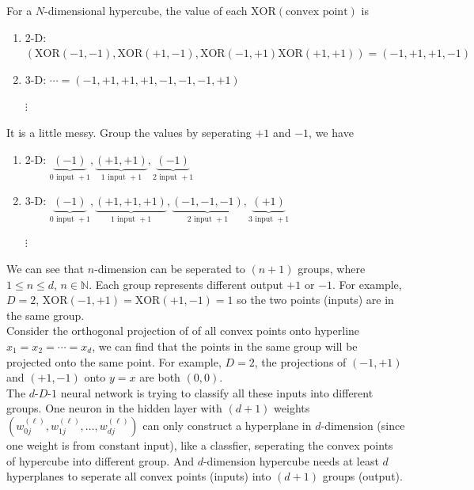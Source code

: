 \documentclass[12pt]{article}
\newcommand{\ParTh}[1]{\left(#1\right)}
\begin{document}
For a $N$-dimensional hypercube, the value of each $\text{XOR}\ParTh{\text{convex point}}$ is
\begin{enumerate}
	\item 2-D: $\ParTh{\text{XOR}\ParTh{-1,-1},\text{XOR}\ParTh{+1,-1},\text{XOR}\ParTh{-1,+1}\text{XOR}\ParTh{+1,+1}}=\ParTh{-1,+1,+1,-1}$
	\item 3-D: $\cdots=\ParTh{-1,+1,+1,+1,-1,-1,-1,+1}$
	\item[$\vdots$]
\end{enumerate}
It is a little messy. Group the values by seperating $+1$ and $-1$, we have
\begin{enumerate}
	\item 2-D: $\underbrace{\ParTh{-1}}_{0\text{ input } +1},\underbrace{\ParTh{+1,+1}}_{1\text{ input } +1},\underbrace{\ParTh{-1}}_{2\text{ input } +1}$
	\item 3-D: $\underbrace{\ParTh{-1}}_{0\text{ input } +1},\underbrace{\ParTh{+1,+1,+1}}_{1\text{ input } +1},\underbrace{\ParTh{-1,-1,-1}}_{2\text{ input } +1},\underbrace{\ParTh{+1}}_{3\text{ input } +1}$
	\item[$\vdots$]
\end{enumerate}
We can see that $n$-dimension can be seperated to $\ParTh{n+1}$ groups, where $1\leq n\leq d$, $n\in\mathbb{N}$. Each group represents different output $+1$ or $-1$. For example, $D=2$, $\text{XOR}\ParTh{-1,+1}=\text{XOR}\ParTh{+1,-1}=1$ so the two points (inputs) are in the same group. \\

Consider the orthogonal projection of of all convex points onto hyperline $x_1=x_2=\cdots=x_d$, we can find that the points in the same group will be projected onto the same point. For example, $D=2$, the projections of $\ParTh{-1,+1}$ and $\ParTh{+1,-1}$ onto $y=x$ are both $\ParTh{0,0}$. \\%

The $d\text{-}D\text{-}1$ neural network is trying to classify all these inputs into different groups. One neuron in the hidden layer with $\ParTh{d+1}$ weights $\ParTh{w^{\ParTh{\ell}}_{0j},w^{\ParTh{\ell}}_{1j},\ldots,w^{\ParTh{\ell}}_{dj}}$ can only construct a hyperplane in $d$-dimension (since one weight is from constant input), like a classfier, seperating the convex points of hypercube into different group. And $d$-dimension hypercube needs at least $d$ hyperplanes to seperate all convex points (inputs) into $\ParTh{d+1}$ groups (output).
\end{document}
